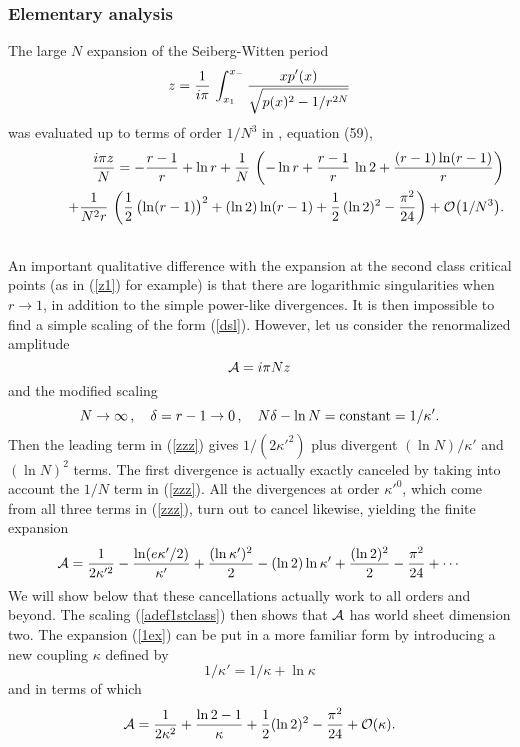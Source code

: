 \documentclass[a4paper,12pt]{article}
\begin{document}
{\subsubsection{Elementary analysis}
%
The large $N$ expansion of the Seiberg-Witten period
%
\begin{equation}
\label{SW1st}
z = {1\over i\pi}\, \int_{x_{1}}^{x_{-}} {\displaystyle xp'(x)\over
\displaystyle\sqrt{p(x)^{2} - 1/r^{2N}}}
\end{equation}
%
was evaluated up to terms of order $1/N^{3}$ in \cite{fer}, equation (59),
%
\begin{eqnarray}
\label{zzz}
&&\hskip -1cm
{i\pi z\over N} = -{r-1\over r} + \ln r + {1\over N}\, \left(
-\ln r + {r-1\over r}\, \ln 2 + {(r-1)\ln(r-1)\over r}\right) \\
\nonumber
&& \hskip 1cm
+{1\over N^2 r}\, \left( {1\over 2}\, \bigl( \ln(r-1) \bigr)^2 + 
(\ln 2)\ln(r-1) + {1\over 2}\, (\ln 2)^2 - {\pi^2\over 24} \right)
+ {\cal O}\bigl( 1/N^3 \bigr).\\ \nonumber
\end{eqnarray}
%
An important qualitative difference with the expansion at the
second class critical points (as in (\ref{z1}) for example) 
is that there are logarithmic singularities when $r\rightarrow 1$, 
in addition to the simple 
power-like divergences. It is then impossible to find a simple scaling of 
the form (\ref{dsl}). However, let us consider the renormalized amplitude
%
\begin{equation}
\label{adef1stclass}
{\cal A} = i\pi N z
\end{equation}
%
and the modified scaling
%
\begin{equation}
\label{sca1stclass}
N\rightarrow\infty \, ,\quad \delta = r-1\rightarrow 0\, ,\quad
N\delta - \ln N = {\rm constant} = 1/\kappa' .
\end{equation}
%
Then the leading term in (\ref{zzz}) gives $1/(2\kappa'^{2})$ plus divergent
$(\ln N)/\kappa'$ and $(\ln N)^{2}$ terms. The first divergence is 
actually exactly canceled by taking into account the $1/N$ term in 
(\ref{zzz}). All the divergences at order $\kappa'^{0}$, which come from 
all three terms in (\ref{zzz}), turn out to cancel likewise, yielding 
the finite expansion
%
\begin{equation}
\label{1ex}
{\cal A} = {1\over 2\kappa'^{2}} - {\ln(e\kappa' /2)\over\kappa'} + 
{(\ln\kappa')^{2}\over 2} - (\ln 2)\ln\kappa' + {(\ln 2)^{2}\over 2} - 
{\pi^{2}\over 24} + \cdots
\end{equation}
%
We will show below that these cancellations actually work to all orders 
and beyond. The scaling (\ref{adef1stclass}) 
then shows that $\cal A$ has world sheet dimension two.  
The expansion (\ref{1ex}) can be put in a more familiar form by 
introducing a new coupling $\kappa$ defined by
%
\begin{equation}
\label{kapdef1}
1/\kappa' =1/\kappa + \ln\kappa
\end{equation}
%
and in terms of which
%
\begin{equation}
\label{goodexp}
{\cal A} = {1\over 2\kappa^{2}} + {\ln 2 -1\over\kappa} + {1\over 2}(\ln 
2)^{2} - {\pi^{2}\over 24} + {\cal O}(\kappa).
\end{equation}
%
}
\end{document}
